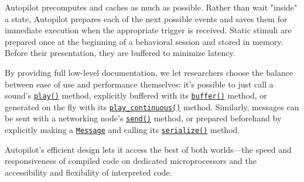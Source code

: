 Autopilot precomputes and caches as much as possible. Rather than wait "inside" a state, Autopilot prepares each of the next possible events and saves them for immediate execution when the appropriate trigger is received. Static stimuli are prepared once at the beginning of a behavioral session and stored in memory. Before their presentation, they are buffered to minimize latency.

By providing full low-level documentation, we let researchers choose the balance between ease of use and performance themselves: it's possible to just call a sound's \texttt{\href{https://docs.auto-pi-lot.com/en/latest/stim/sound/base.html\#autopilot.stim.sound.base.Jack_Sound.play}{play()}} method, explicitly buffered with its \texttt{\href{https://docs.auto-pi-lot.com/en/latest/stim/sound/base.html\#autopilot.stim.sound.base.Jack_Sound.buffer}{buffer()}} method, or generated on the fly with its \texttt{\href{https://docs.auto-pi-lot.com/en/latest/stim/sound/base.html\#autopilot.stim.sound.base.Jack_Sound.play_continuous}{play\_continuous()}} method. Similarly, messages can be sent with a networking node's \texttt{\href{https://docs.auto-pi-lot.com/en/latest/networking/node.html\#autopilot.networking.node.Net_Node.send}{send()}} method, or prepared beforehand by explicitly making a \texttt{\href{https://docs.auto-pi-lot.com/en/latest/networking/message.html\#autopilot.networking.message.Message}{Message}} and calling its \texttt{\href{https://docs.auto-pi-lot.com/en/latest/networking/message.html\#autopilot.networking.message.Message.serialize}{serialize()}} method.

\vspace{16pt}

Autopilot's efficient design lets it access the best of both worlds---the speed and responsiveness of compiled code on dedicated microprocessors and the accessibility and flexibility of interpreted code.